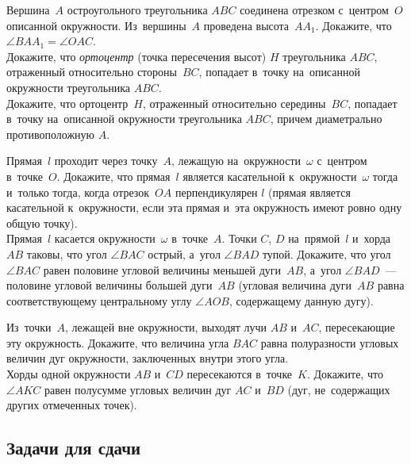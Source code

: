 \begin{problems}
\item
\subproblem
Вершина~$A$ остроугольного треугольника $ABC$ соединена отрезком с~центром~$O$
описанной окружности.
Из~вершины~$A$ проведена высота~$A A_1$.
Докажите, что $\angle B A A_1 = \angle O A C$.
\\
\subproblem
Докажите, что \emph{ортоцентр} (точка пересечения высот) $H$
треугольника $ABC$, отраженный относительно стороны~$BC$, попадает в~точку
на~описанной окружности треугольника $ABC$.
\\
\subproblem
Докажите, что ортоцентр~$H$, отраженный относительно середины~$BC$, попадает
в~точку на~описанной окружности треугольника $ABC$, причем диаметрально
противоположную $A$.

\item
\subproblem
Прямая~$l$ проходит через точку~$A$, лежащую на~окружности~$\omega$
с~центром в~точке~$O$.
Докажите, что прямая~$l$ является касательной к~окружности~$\omega$ тогда
и~только тогда, когда отрезок~$OA$ перпендикулярен $l$ (прямая является
касательной к~окружности, если эта прямая и~эта окружность имеют ровно одну
общую точку).
\\
\subproblem
Прямая~$l$ касается окружности~$\omega$ в~точке~$A$.
Точки $C$, $D$ на~прямой~$l$ и~хорда~$AB$ таковы, что угол $\angle BAC$ острый,
а~угол $\angle BAD$ тупой.
Докажите, что угол $\angle BAC$ равен половине угловой величины
меньшей дуги~$AB$, а~угол $\angle BAD$~--- половине угловой величины
большей дуги~$AB$ (угловая величина дуги~$AB$ равна соответствующему
центральному углу $\angle AOB$, содержащему данную дугу).

\item
\subproblem
Из~точки~$A$, лежащей вне окружности, выходят лучи $AB$ и~$AC$, пересекающие
эту окружность.
Докажите, что величина угла $BAC$ равна полуразности угловых величин дуг
окружности, заключенных внутри этого угла.
\\
\subproblem
Хорды одной окружности $AB$ и~$CD$ пересекаются в~точке~$K$.
Докажите, что $\angle AKC$ равен полусумме угловых величин дуг $AC$ и~$BD$
(дуг, не~содержащих других отмеченных точек).

\end{problems}

\clearpage\resetproblem


\subsection*{Задачи для сдачи}

